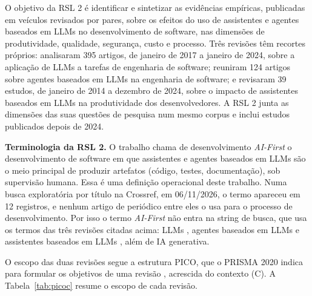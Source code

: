 O objetivo da RSL 2 é identificar e sintetizar as evidências empíricas,
publicadas em veículos revisados por pares, sobre os efeitos do uso de
assistentes e agentes baseados em LLMs no desenvolvimento de software, nas
dimensões de produtividade, qualidade, segurança, custo e processo. Três
revisões têm recortes próprios:  analisaram 395 artigos,
de janeiro de 2017 a janeiro de 2024, sobre a aplicação de LLMs a tarefas de
engenharia de software;  reuniram 124 artigos sobre
agentes baseados em LLMs na engenharia de software; e 
revisaram 39 estudos, de janeiro de 2014 a dezembro de 2024, sobre o impacto
de assistentes baseados em LLMs na produtividade dos desenvolvedores. A RSL 2
junta as dimensões das suas questões de pesquisa num mesmo corpus e inclui
estudos publicados depois de 2024.

\textbf{Terminologia da RSL 2.} O trabalho chama de desenvolvimento
\textit{AI-First} o desenvolvimento de software em que assistentes e agentes
baseados em LLMs são o meio principal de produzir artefatos (código, testes,
documentação), sob supervisão humana. Essa é uma definição operacional deste
trabalho. Numa busca exploratória por título na Crossref, em 06/11/2026, o
termo apareceu em 12 registros, e nenhum artigo de periódico entre eles o usa
para o processo de desenvolvimento. Por isso o termo \textit{AI-First} não
entra na string de busca, que usa os termos das três revisões citadas acima:
LLMs \cite{hou2024}, agentes baseados em LLMs \cite{liu2026} e assistentes
baseados em LLMs \cite{mohamed2026}, além de IA generativa.

O escopo das duas revisões segue a estrutura PICO, que o PRISMA 2020 indica
para formular os objetivos de uma revisão \cite[item 4]{page2021ee}, acrescida
do contexto (C). A Tabela~\ref{tab:picoc} resume o escopo de cada revisão.

